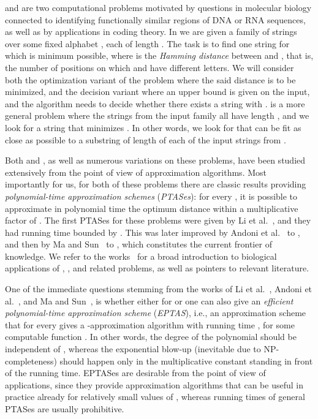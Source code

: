 \clString and \clSubstring are two computational problems motivated by questions in molecular biology connected to identifying functionally similar regions of DNA or RNA sequences, as well as by applications in coding theory. In \clString we are given a family  of strings over some fixed alphabet , each of length . The task is to find one string  for which  is minimum possible, where  is the {\em{Hamming distance}} between  and , that is, the number of positions on which  and  have different letters. We will consider both the optimization variant of the problem where the said distance is to be minimized, and the decision variant where an upper bound  is given on the input, and the algorithm needs to decide whether there exists a string  with . \clSubstring is a more general problem where the strings from the input family  all have length , and we look for a string  that minimizes . In other words, we look for  that can be fit as close as possible to a substring of length  of each of the input strings from .

Both \clString and \clSubstring, as well as numerous variations on these problems, have been studied extensively from the point of view of approximation algorithms. Most importantly for us, for both of these problems there are classic results providing {\em{polynomial-time approximation schemes}} ({\em{PTASes}}): for every , it is possible to approximate in polynomial time the optimum distance within a multiplicative factor of . The first PTASes for these problems were given by Li et al.~\cite{limawang}, and they had running time bounded by . This was later improved by Andoni et al.~\cite{AndoniIP06} to , and then by Ma and Sun~\cite{MaS09} to , which constitutes the current frontier of  knowledge. We refer to the works~\cite{Boucher15,LiMW02a,GrammNR03,limawang,MaS09,Marx08} for a broad introduction to biological applications of \clString, \clSubstring, and related problems, as well as pointers to relevant literature.

One of the immediate questions stemming from the works of Li et al.~\cite{limawang}, Andoni et al.~\cite{AndoniIP06}, and Ma and Sun~\cite{MaS09}, is whether either for \clString or \clSubstring one can also give an {\em{efficient polynomial-time approximation scheme}} ({\em{EPTAS}}), i.e., an approximation scheme that for every  gives a -approximation algorithm with running time , for some computable function . In other words, the degree of the polynomial should be independent of , whereas the exponential blow-up (inevitable due to NP-completeness) should happen only in the multiplicative constant standing in front of the running time. EPTASes are desirable from the point of view of applications, since they provide approximation algorithms that can be useful in practice already for relatively small values of , whereas running times of general PTASes are usually prohibitive.

